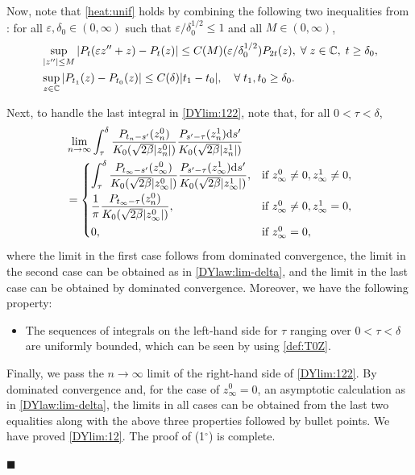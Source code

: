 \documentclass[12pt, twoside]{article}
\numberwithin{figure}{section}
\newcommand{\1}{\mathds 1}
\newcommand{\vep}{{\varepsilon}}
\renewcommand{\d}{{\mathrm d}}
\newcommand{\2}{{\mathbf 1}}
\renewenvironment{proof}[1][\proofname]{\noindent {\bfseries #1.}\;}{\hfill\ensuremath{\blacksquare}\\}
\newcommand{\cc}{{^\circ}}
\begin{document}
\begin{proof}[Proof of Theorem~\ref{thm:formulas}]
\begin{itemize}
Now, note that \eqref{heat:unif} holds by combining the following two inequalities from \cite[Lemma~4.16 (2$\cc$) and (3$\cc$)]{C:DBG}: for all $\vep,\delta_0\in (0,\infty)$ such that $\vep/\delta_0^{1/2}\leq 1$ 
and all $M\in (0,\infty)$,
\begin{align}
&\sup_{|z''|\leq M}|P_t(\vep z''+z)-P_t(z)|\leq C(M)(\vep/\delta_0^{1/2})P_{2t}(z),\; \forall\;z\in \Bbb C,\;t\geq \delta_0,\label{gauss:vep}\\
&\sup_{z\in \Bbb C}|P_{t_1}(z)-P_{t_0}(z)|\leq C(\delta)|t_1-t_0|,\quad\forall\;t_1,t_0\geq \delta_0.\label{kernel:tmod}
\end{align}
\end{itemize}

Next, to handle the last integral in \eqref{DYlim:122}, note that, for all $0<\tau<\delta$,
\begin{align*}
&\lim_{n\to\infty}\int_{\tau}^{\delta} \frac{P_{t_n-s'}( z_n^0)}{K_0(\sqrt{2\beta}|z_n^0|)} \frac{P_{s'-\tau}(z_n^1)\d s'}{K_0(\sqrt{2\beta }|z_n^1|)}\\
&=
\begin{cases}
\displaystyle \int_{\tau}^{\delta} \frac{P_{t_\infty-s'}( z_\infty^0)}{K_0(\sqrt{2\beta}|z_\infty^0|)} \frac{P_{s'-\tau}(z_\infty^1)\d s'}{K_0(\sqrt{2\beta }|z_\infty^1|)}
,&\mbox{if } z^0_\infty\neq 0,z^1_\infty\neq 0,\\
\vspace{-.4cm}\\
\displaystyle  \frac{1}{\pi}\frac{P_{t_\infty-\tau}( z_n^0)}{K_0(\sqrt{2\beta}|z_\infty^0|)},&\mbox{if } z^0_\infty\neq 0,z^1_\infty= 0,\\
\vspace{-.4cm}\\
0,&\mbox{if } z^0_\infty= 0,
\end{cases}
\end{align*}
where the limit in the first case follows from dominated convergence, the limit in the second case can be obtained as in \eqref{DYlaw:lim-delta}, and the limit in the last case can be obtained by dominated convergence. Moreover, we have the following property:
\begin{itemize}
\item The sequences of integrals on the left-hand side for $\tau$ ranging over $0<\tau<\delta$  
are uniformly bounded, which can be seen by using \eqref{def:T0Z}. 
\end{itemize}

Finally, we pass the $n\to\infty$ limit of the right-hand side of \eqref{DYlim:122}. By dominated convergence and, for the case of $z^0_\infty=0$, an asymptotic calculation as in \eqref{DYlaw:lim-delta}, the limits in all cases can be obtained from the last two equalities along with the above three properties followed by bullet points. We have proved \eqref{DYlim:12}. The proof of (1$\cc$) is complete.\smallskip 


\end{proof}
\end{document}
